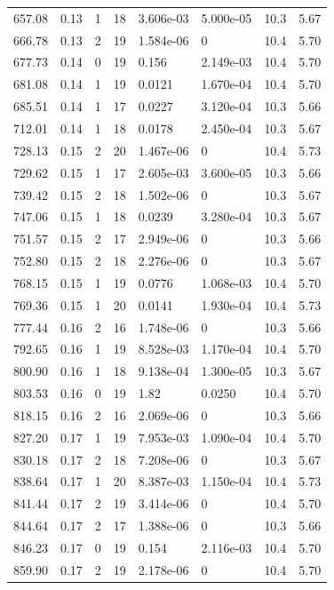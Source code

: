 \documentclass[preview]{standalone}
\begin{document}
{{{\begin{tabular}{L{1.2cm}C{1.2cm} C{0.3cm}C{0.5cm} C{1.4cm}C{1.4cm} C{1.4cm}C{1.4cm}}
  657.08  &  0.13  & 1     & 18 &  3.606e-03  & 5.000e-05  & 10.3 &  5.67   \\ 
  666.78  &  0.13  & 2     & 19 &  1.584e-06  & 0  & 10.4 &  5.70   \\ 
  677.73  &  0.14  & 0     & 19 &  0.156  & 2.149e-03  & 10.4 &  5.70   \\ 
  681.08  &  0.14  & 1     & 19 &  0.0121  & 1.670e-04  & 10.4 &  5.70   \\ 
  685.51  &  0.14  & 1     & 17 &  0.0227  & 3.120e-04  & 10.3 &  5.66   \\ 
  712.01  &  0.14  & 1     & 18 &  0.0178  & 2.450e-04  & 10.3 &  5.67   \\ 
  728.13  &  0.15  & 2     & 20 &  1.467e-06  & 0  & 10.4 &  5.73   \\ 
  729.62  &  0.15  & 1     & 17 &  2.605e-03  & 3.600e-05  & 10.3 &  5.66   \\ 
  739.42  &  0.15  & 2     & 18 &  1.502e-06  & 0  & 10.3 &  5.67   \\ 
  747.06  &  0.15  & 1     & 18 &  0.0239  & 3.280e-04  & 10.3 &  5.67   \\ 
  751.57  &  0.15  & 2     & 17 &  2.949e-06  & 0  & 10.3 &  5.66   \\ 
  752.80  &  0.15  & 2     & 18 &  2.276e-06  & 0  & 10.3 &  5.67   \\ 
  768.15  &  0.15  & 1     & 19 &  0.0776  & 1.068e-03  & 10.4 &  5.70   \\ 
  769.36  &  0.15  & 1     & 20 &  0.0141  & 1.930e-04  & 10.4 &  5.73   \\ 
  777.44  &  0.16  & 2     & 16 &  1.748e-06  & 0  & 10.3 &  5.66   \\ 
  792.65  &  0.16  & 1     & 19 &  8.528e-03  & 1.170e-04  & 10.4 &  5.70   \\ 
  800.90  &  0.16  & 1     & 18 &  9.138e-04  & 1.300e-05  & 10.3 &  5.67   \\ 
  803.53  &  0.16  & 0     & 19 &  1.82  & 0.0250  & 10.4 &  5.70   \\ 
  818.15  &  0.16  & 2     & 16 &  2.069e-06  & 0  & 10.3 &  5.66   \\ 
  827.20  &  0.17  & 1     & 19 &  7.953e-03  & 1.090e-04  & 10.4 &  5.70   \\ 
  830.18  &  0.17  & 2     & 18 &  7.208e-06  & 0  & 10.3 &  5.67   \\ 
  838.64  &  0.17  & 1     & 20 &  8.387e-03  & 1.150e-04  & 10.4 &  5.73   \\ 
  841.44  &  0.17  & 2     & 19 &  3.414e-06  & 0  & 10.4 &  5.70   \\ 
  844.64  &  0.17  & 2     & 17 &  1.388e-06  & 0  & 10.3 &  5.66   \\ 
  846.23  &  0.17  & 0     & 19 &  0.154  & 2.116e-03  & 10.4 &  5.70   \\ 
  859.90  &  0.17  & 2     & 19 &  2.178e-06  & 0  & 10.4 &  5.70   \\ 
\hline 
\end{tabular} 

}}}
\end{document}
